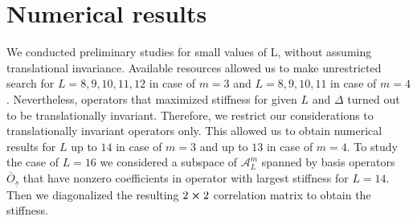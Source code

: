 \chapter{Numerical results}
\thispagestyle{chapterBeginStyle}


We conducted preliminary studies for small values of L, without assuming translational invariance. Available resources
allowed us to make unrestricted search for \(L = 8,9,10,11,12\) in case of \(m = 3\) and \(L = 8,9,10,11\) in case of
\(m = 4\). Nevertheless, operators that maximized stiffness for given \(L\) and \(\Delta \) turned out to be translationally
invariant. Therefore, we restrict our considerations to translationally invariant operators only. This allowed us
to obtain numerical results for \(L\) up to \(14\) in case of \(m = 3\) and up to \(13\) in case of \(m = 4\).
To study the case of  \(L = 16\) we considered a subspace of \(\mathcal{A}_L^m\) spanned by basis operators
\(\overline{O}_{\underline{s}}\) that have nonzero coefficients in operator with largest stiffness for \(L = 14\). 
Then we diagonalized the resulting \(2\cross 2\) correlation matrix to obtain the stiffness.


